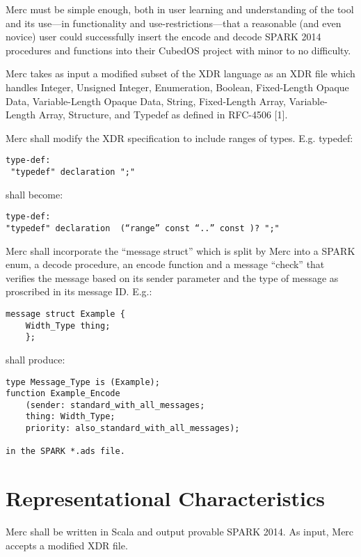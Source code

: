 Merc must be simple enough, both in user learning and understanding of the tool and its
use—in functionality and use-restrictions—that a reasonable (and even novice) user could
successfully insert the encode and decode SPARK 2014 procedures and functions into their CubedOS
project with minor to no difficulty.

Merc takes as input a modified subset of the XDR language as an XDR file which handles
Integer, Unsigned Integer, Enumeration, Boolean, Fixed-Length Opaque Data, Variable-Length
Opaque Data, String, Fixed-Length Array, Variable-Length Array, Structure, and Typedef as
defined in RFC-4506 [1].

Merc shall modify the XDR specification to include ranges of types. E.g. typedef:

\begin{verbatim}
type-def:          
 "typedef" declaration ";"
\end{verbatim} 

shall become:

\begin{verbatim}
type-def:
"typedef" declaration  (“range” const “..” const )? ";"         
\end{verbatim}

Merc shall incorporate the ``message struct'' which is split by Merc into a SPARK enum, a
decode procedure, an encode function and a message “check” that verifies the message based on
its sender parameter and the type of message as proscribed in its message ID. E.g.:

\begin{verbatim}
message struct Example {
	Width_Type thing;
	};
\end{verbatim}

shall produce:

\begin{verbatim}
type Message_Type is (Example);
function Example_Encode 
	(sender: standard_with_all_messages; 
	thing: Width_Type; 
	priority: also_standard_with_all_messages);

in the SPARK *.ads file.
\end{verbatim}

\section{Representational Characteristics}

Merc shall be written in Scala and output provable SPARK 2014. As input, Merc accepts a
modified XDR file.

